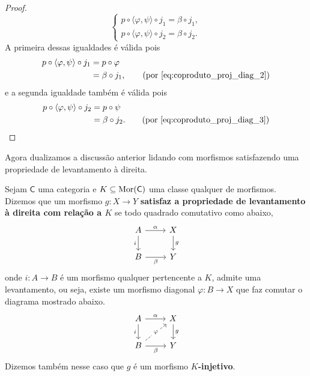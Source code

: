 \begin{proof}
  \begin{displaymath}
    \begin{cases}
      p \circ \langle \varphi,\psi \rangle \circ j_1 = \beta \circ j_1, \\
      p \circ \langle \varphi,\psi \rangle \circ j_2 = \beta \circ j_2.
    \end{cases}
  \end{displaymath}
  A primeira dessas igualdades é válida pois
  \begin{align*}
    p \circ \langle \varphi,\psi \rangle \circ j_1
    & = p \circ \varphi \\
    & = \beta \circ j_1,
    \tag{por \eqref{eq:coproduto_proj_diag_2}}
  \end{align*}
  e a segunda igualdade também é válida pois
  \begin{align*}
    p \circ \langle \varphi,\psi \rangle \circ j_2
    & = p \circ \psi \\
    & = \beta \circ j_2.
    \tag{por \eqref{eq:coproduto_proj_diag_3}}
  \end{align*}
\end{proof}

Agora dualizamos a discussão anterior lidando com morfismos satisfazendo uma propriedade de levantamento à direita.

\begin{defin}\label{defin:morfismo_inj}
  Sejam $\mathsf{C}$ uma categoria e $K \subseteq \mathrm{Mor}(\mathsf{C})$ uma classe qualquer de morfismos.
  Dizemos que um morfismo $g: X \to Y$ \textbf{satisfaz a propriedade de levantamento à direita com relação a $K$} se todo quadrado comutativo como abaixo,
  \begin{displaymath}
    \begin{tikzcd}
      A
      \arrow[d, "i" swap]
      \arrow[r, "\alpha"]
      & X
      \arrow[d, "g"]
      \\ B
      \arrow[r, "\beta" swap]
      & Y
    \end{tikzcd}
  \end{displaymath}
  onde $i: A \to B$ é um morfismo qualquer pertencente a $K$, admite uma levantamento, ou seja, existe um morfismo diagonal $\varphi: B \to X$ que faz comutar o diagrama mostrado abaixo.
  \begin{displaymath}
    \begin{tikzcd}
      A
      \arrow[d, "i" swap]
      \arrow[r, "\alpha"]
      & X
      \arrow[d, "g"]
      \\ B
      \arrow[r, "\beta" swap]
      \arrow[ru, dashed, "\varphi" description]
      & Y
    \end{tikzcd}
  \end{displaymath}
  Dizemos também nesse caso que $g$ é um morfismo \textbf{$K$-injetivo}. 
\end{defin}

